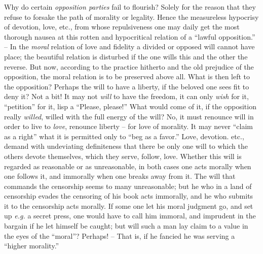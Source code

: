Why do certain \textit{opposition parties} fail to flourish? Solely for the 
reason that they refuse to forsake the path of morality or legality. Hence the 
measureless hypocrisy of devotion, love, etc., from whose repulsiveness one 
may daily get the most thorough nausea at this rotten and hypocritical 
relation of a ``lawful opposition.'' -- In the \textit{moral} relation of 
love and fidelity a divided or opposed will cannot have place; the beautiful 
relation is disturbed if the one wills this and the other the reverse. But 
now, according to the practice hitherto and the old prejudice of the 
opposition, the moral relation is to be preserved above all. What is then left 
to the opposition? Perhaps the will to have a liberty, if the beloved one sees 
fit to deny it? Not a bit! It may not \textit{will} to have the freedom, it 
can only \textit{wish} for it, ``petition'' for it, lisp a ``Please, 
please!'' What would come of it, if the opposition really \textit{willed}, 
willed with the full energy of the will? No, it must renounce will in order to 
live to \textit{love}, renounce liberty -- for love of morality. It may never 
``claim as a right'' what it is permitted only to ``beg as a favor.'' 
Love, devotion. etc., demand with undeviating definiteness that there be only 
one will to which the others devote themselves, which they serve, follow, 
love. Whether this will is regarded as reasonable or as unreasonable, in both 
cases one acts morally when one follows it, and immorally when one breaks away 
from it. The will that commands the censorship seems to many unreasonable; but 
he who in a land of censorship evades the censoring of his book acts 
immorally, and he who submits it to the censorship acts morally. If some one 
let his moral judgment go, and set up \textit{e.g.} a secret press, one would 
have to call him immoral, and imprudent in the bargain if he let himself be 
caught; but will such a man lay claim to a value in the eyes of the 
``moral''? Perhaps! -- That is, if he fancied he was serving a ``higher 
morality.''

